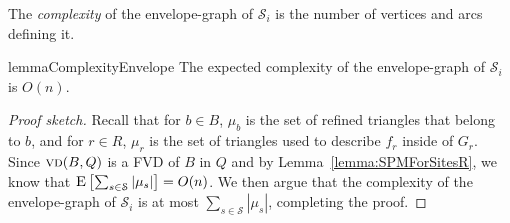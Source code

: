 \documentclass[a4paper,UKenglish]{socg-lipics-v2018}
\newcommand{\s}{\mathcal S}
\newcommand{\vd}[2][P]{\textsc{vd}(#2, #1)}
\newcommand{\ex}[1]{\textsc{E}\left[#1\right]}
\begin{document}
The \emph{complexity} of the envelope-graph of $\s_i$ is the number of vertices and arcs defining it.

\begin{restatable}{lemma}{ComplexityEnvelope}\label{lemma: Complexity of envelope-graph}
The expected complexity of the envelope-graph of $\s_i$ is $O(n)$.
\end{restatable}
\begin{proof}[Proof sketch]
Recall that for $b\in B$, $\mu_b$ is the set of refined triangles that belong to $b$, and for $r\in R$, $\mu_r$ is the set of triangles used to describe $f_r$ inside of $G_r$. Since $\vd[Q]{B}$ is a FVD of $B$ in $Q$ and by Lemma~\ref{lemma:SPMForSitesR}, we know that $\ex{\sum_{s\in \s} |\mu_s|} = O(n)$. 
We then argue that the complexity of the envelope-graph of $\s_i$ is at most $\sum_{s\in \s} |\mu_s|$, completing the proof.
\end{proof}
\end{document}
